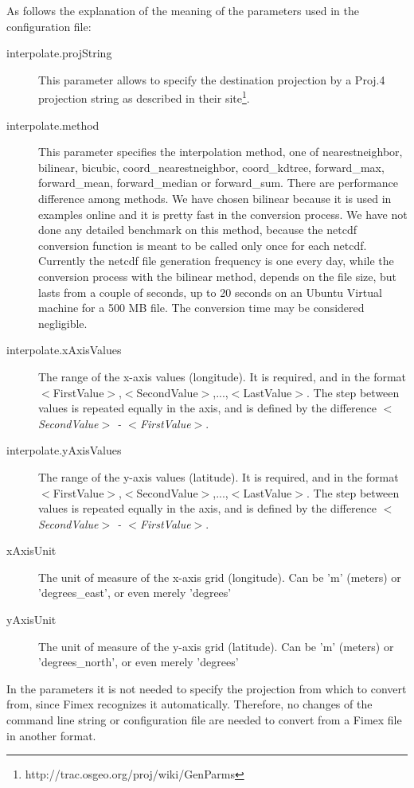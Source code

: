 \documentclass[11pt,a4paper,titlepage,oneside]{report}
\begin{document}
As follows the explanation of the meaning of the parameters used in the configuration file:
\begin{description}
\item[interpolate.projString] This parameter allows to specify the destination projection by a Proj.4 projection string as described in their site\footnote{http://trac.osgeo.org/proj/wiki/GenParms}.
\item[interpolate.method] This parameter specifies the interpolation method, one of nearestneighbor, bilinear, bicubic, coord\_nearestneighbor, coord\_kdtree, forward\_max, forward\_mean, forward\_median or forward\_sum. There are performance difference among methods. We have chosen bilinear because it is used in examples online and it is pretty fast in the conversion process. We have not done any detailed benchmark on this method, because the \gls{netcdf} conversion function is meant to be called only once for each \gls{netcdf}. Currently the \gls{netcdf} file generation frequency is one every day, while the conversion process with the bilinear method, depends on the file size, but lasts from a couple of seconds, up to 20 seconds on an Ubuntu Virtual machine for a 500 MB file. The conversion time may be considered negligible.
\item[interpolate.xAxisValues] The range of the x-axis values (longitude). It is required, and in the format $<$FirstValue$>$,$<$SecondValue$>$,...,$<$LastValue$>$. The step between values is repeated equally in the axis, and is defined by the difference \textit{$<$SecondValue$>$ - $<$FirstValue$>$}.
\item[interpolate.yAxisValues] The range of the y-axis values (latitude). It is required, and in the format $<$FirstValue$>$,$<$SecondValue$>$,...,$<$LastValue$>$. The step between values is repeated equally in the axis, and is defined by the difference \textit{$<$SecondValue$>$ - $<$FirstValue$>$}.
\item[xAxisUnit] The unit of measure of the x-axis grid (longitude). Can be 'm' (meters) or 'degrees\_east', or even merely 'degrees'
\item[yAxisUnit] The unit of measure of the y-axis grid (latitude). Can be 'm' (meters) or 'degrees\_north', or even merely 'degrees'
\end{description}

In the parameters it is not needed to specify the projection from which to convert from, since Fimex recognizes it automatically. Therefore, no changes of the command line string or configuration file are needed to convert from a Fimex file in another format.
\end{document}
